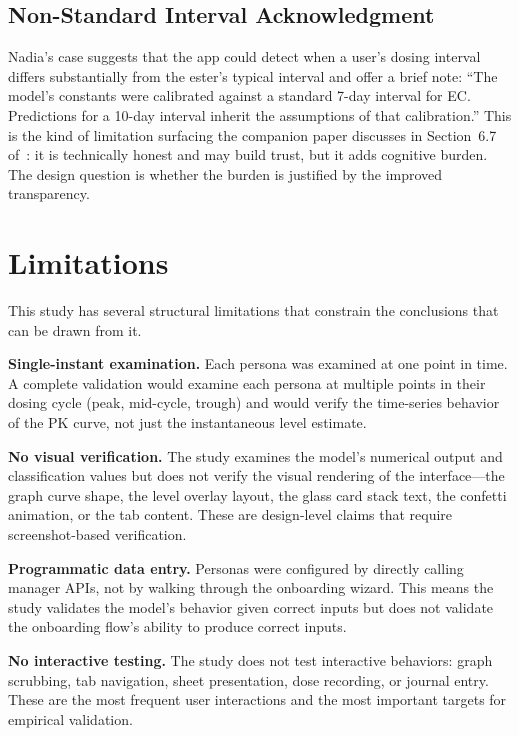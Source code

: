 \documentclass[11pt,a4paper]{article}
\begin{document}
\subsection{Non-Standard Interval Acknowledgment}

Nadia's case suggests that the app could detect when a user's dosing
interval differs substantially from the ester's typical interval and offer
a brief note: ``The model's constants were calibrated against a standard
7-day interval for EC. Predictions for a 10-day interval inherit the
assumptions of that calibration.'' This is the kind of limitation surfacing
the companion paper discusses in Section~6.7 of~\cite{xtux}: it is
technically honest and may build trust, but it adds cognitive burden. The
design question is whether the burden is justified by the improved
transparency.

\section{Limitations}
\label{sec:limitations}

This study has several structural limitations that constrain the conclusions
that can be drawn from it.

\textbf{Single-instant examination.} Each persona was examined at one point
in time. A complete validation would examine each persona at multiple points
in their dosing cycle (peak, mid-cycle, trough) and would verify the
time-series behavior of the PK curve, not just the instantaneous level
estimate.

\textbf{No visual verification.} The study examines the model's numerical
output and classification values but does not verify the visual rendering of
the interface---the graph curve shape, the level overlay layout, the glass
card stack text, the confetti animation, or the tab content. These are
design-level claims that require screenshot-based verification.

\textbf{Programmatic data entry.} Personas were configured by directly
calling manager APIs, not by walking through the onboarding wizard. This
means the study validates the model's behavior given correct inputs but does
not validate the onboarding flow's ability to produce correct inputs.

\textbf{No interactive testing.} The study does not test interactive
behaviors: graph scrubbing, tab navigation, sheet presentation, dose
recording, or journal entry. These are the most frequent user interactions
and the most important targets for empirical validation.
\end{document}
